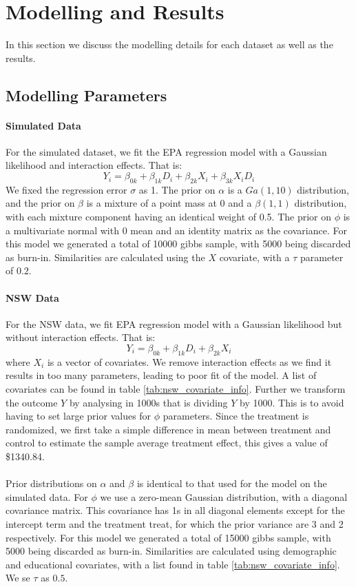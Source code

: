 \documentclass{article}
\begin{document}
\section{Modelling and Results}
In this section we discuss the modelling details for each dataset as well as the results. 

\subsection{Modelling Parameters}
\paragraph{Simulated Data}
For the simulated dataset, we fit the EPA regression model with a Gaussian likelihood and interaction effects. That is:
$$Y_i = \beta_{0k} + \beta_{1k}D_i + \beta_{2k}X_i + \beta_{3k}X_iD_i$$ We fixed the regression error $\sigma$ as 1. The prior on $\alpha$ is a $Ga(1,10)$ distribution, and the prior on $\beta$ is a mixture of a point mass at 0 and a $\beta(1,1)$ distribution, with each mixture component having an identical weight of 0.5. The prior on $\phi$ is a multivariate normal with 0 mean and an identity matrix as the covariance.  For this model we generated a total of 10000 gibbs sample, with 5000 being discarded as burn-in. Similarities are calculated using the $X$ covariate, with a $\tau$ parameter of $0.2$.

\paragraph{NSW Data} For the NSW data, we fit EPA regression model with a Gaussian likelihood but without interaction effects. That is:
$$Y_i = \beta_{0k} + \beta_{1k}D_i + \beta_{2k}X_i$$ where $X_i$ is a vector of covariates. We remove interaction effects as we find it results in too many parameters, leading to poor fit of the model. A list of covariates can be found in table \ref{tab:nsw_covariate_info}. Further we transform the outcome $Y$ by analysing in 1000s that is dividing $Y$ by 1000. This is to avoid having to set large prior values for $\phi$ parameters. Since the treatment is randomized, we first take a simple difference in mean between treatment and control to estimate the sample average treatment effect, this gives a value of \$1340.84.
\\ \\
Prior distributions on $\alpha$ and $\beta$ is identical to that used for the model on the simulated data. For $\phi$ we use a zero-mean Gaussian distribution, with a diagonal covariance matrix. This covariance has 1s in all diagonal elements except for the intercept term and the treatment treat, for which the prior variance are 3 and 2 respectively. For this model we generated a total of 15000 gibbs sample, with 5000 being discarded as burn-in. Similarities are calculated using demographic and educational covariates, with a list found in table \ref{tab:nsw_covariate_info}. We se $\tau$ as $0.5$.
\end{document}
